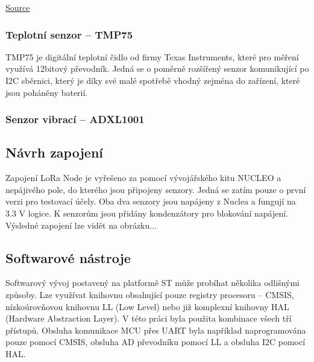    
    \href{https://www.st.com/en/evaluation-tools/i-nucleo-sx1272d.html}{Source}




\subsubsection{Teplotní senzor – TMP75}

    TMP75 je digitální teplotní čidlo od firmy Texas Instruments, které pro měření využívá 12bitový převodník. Jedná se o poměrně rozšířený senzor komunikující po I2C sběrnici, který je díky své malé spotřebě vhodný zejména do zařízení, které jsou poháněny baterií.
    

\subsubsection{Senzor vibrací – ADXL1001}

    




\subsection{Návrh zapojení}

    Zapojení LoRa Node je vyřešeno za pomocí vývojářského kitu NUCLEO a nepájivého pole, do kterého jsou připojeny senzory. Jedná se zatím pouze o první verzi pro testovací účely. Oba dva senzory jsou napájeny z Nuclea a fungují na 3.3 V logice. K senzorům jsou přidány kondenzátory pro blokování napájení. Výsledné zapojení lze vidět na obrázku...
    
    


\subsection{Softwarové nástroje}

    Softwarový vývoj postavený na platformě ST může probíhat několika odlišnými způsoby. Lze využívat knihovnu obsahující pouze registry procesoru – CMSIS, nízkoúrovňovou knihovnu LL (Low Level) nebo již komplexní knihovny HAL (Hardware Abstraction Layer). V této práci byla použita kombinace všech tří přístupů. Obsluha komunikace MCU přes UART byla například naprogramována pouze pomocí CMSIS, obsluha AD převodníku pomocí LL a obsluha I2C pomocí HAL.
    
